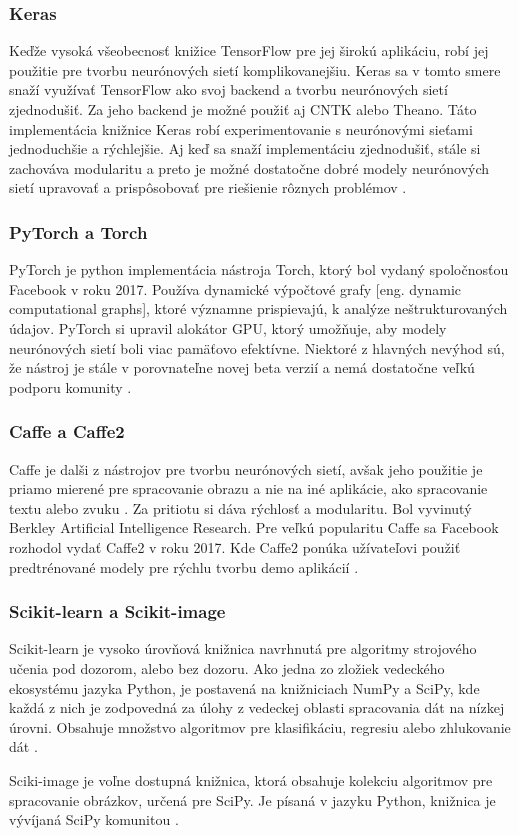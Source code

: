 \subsubsection{Keras}
Keďže vysoká všeobecnosť knižice TensorFlow pre jej širokú aplikáciu, robí jej použitie pre tvorbu neurónových sietí komplikovanejšiu.
Keras sa v tomto smere snaží využívať TensorFlow ako svoj backend a tvorbu neurónových sietí zjednodušiť.
Za jeho backend je možné použiť aj CNTK alebo Theano.
Táto implementácia knižnice Keras robí experimentovanie s neurónovými sieťami jednoduchšie a rýchlejšie.
Aj keď sa snaží implementáciu zjednodušiť, stále si zachováva modularitu a preto je možné dostatočne dobré modely neurónových sietí upravovať a prispôsobovať pre riešienie rôznych problémov \cite{odkaz:Keras}.

\subsubsection{PyTorch a Torch}
PyTorch je python implementácia nástroja Torch, ktorý bol vydaný spoločnosťou Facebook v roku 2017.
Používa dynamické výpočtové grafy [eng. dynamic computational graphs], ktoré významne prispievajú, k analýze neštrukturovaných údajov.
PyTorch si upravil alokátor GPU, ktorý umožňuje, aby modely neurónových sietí boli viac pamäťovo efektívne.
Niektoré z hlavných nevýhod sú, že nástroj je stále v porovnateľne novej beta verzií a nemá dostatočne veľkú podporu komunity \cite{odkaz:FrameworkComparison}.

\subsubsection{Caffe a Caffe2}
Caffe je dalši z nástrojov pre tvorbu neurónových sietí, avšak jeho použitie je priamo mierené pre spracovanie obrazu a nie na iné aplikácie,
    ako spracovanie textu alebo zvuku \cite{odkaz:FrameworkComparison2}.
Za pritiotu si dáva rýchlosť a modularitu. Bol vyvinutý Berkley Artificial Intelligence Research.
Pre veľkú popularitu Caffe sa Facebook rozhodol vydať Caffe2 v roku 2017.
Kde Caffe2 ponúka užívateľovi použiť predtrénované modely pre rýchlu tvorbu demo aplikácií \cite{odkaz:FrameworkComparison}.

\subsubsection{Scikit-learn a Scikit-image}
Scikit-learn je vysoko úrovňová knižnica navrhnutá pre algoritmy strojového učenia pod dozorom, alebo bez dozoru.
Ako jedna zo zložiek vedeckého ekosystému jazyka Python, je postavená na knižniciach NumPy a SciPy, kde každá z nich je zodpovedná za úlohy z vedeckej oblasti spracovania dát na nízkej úrovni.
Obsahuje množstvo algoritmov pre klasifikáciu, regresiu alebo zhlukovanie dát \cite{odkaz:FrameworkComparison3}.

Sciki-image je voľne dostupná knižnica, ktorá obsahuje kolekciu algoritmov pre spracovanie obrázkov, určená pre SciPy.
Je písaná v jazyku Python, knižnica je vývíjaná SciPy komunitou \cite{prop:scikit-image}.
